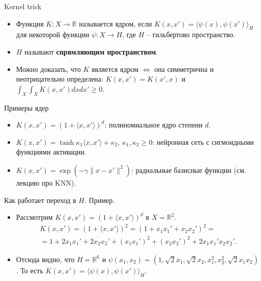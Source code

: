 \documentclass[9pt]{beamer}
\begin{document}
\begin{frame}{Kernel trick}
    \begin{itemize}
        \item Функция $K: X\rightarrow \mathbb{R}$ называется ядром, если $K(x, x') = \langle \psi(x), \psi(x')\rangle_H$ для некоторой функции $\psi: X\rightarrow H$, где $H$ -- гильбертово пространство.
        \item $H$ называют \textbf{спрямляющим пространством}.
        \item Можно доказать, что $K$ является ядром $\Leftrightarrow$ она симметрична и неотрицательно определена: $K(x, x') = K(x', x)$ и $\int_X\int_X K(x, x')dxdx'\geq 0$.
    \end{itemize}
\end{frame}

\begin{frame}{Примеры ядер}
\begin{itemize}
    \item $K(x, x') = (1 + \langle x, x'\rangle)^d$: полиномиальное ядро степени $d$.
    \item $K(x, x') = \tanh \kappa_1 \langle x, x'\rangle + \kappa_2$, $\kappa_1, \kappa_2 \geq 0$: нейронная сеть с сигмоидными функциями активации.
    \item $K(x, x') = \exp(-\gamma\|x-x'\|^2)$: радиальные базисные функции (см. лекцию про KNN).
\end{itemize}
\end{frame}

\begin{frame}{Как работает переход в $H$. Пример.}
    \begin{itemize}
        \item Рассмотрим $K(x, x')=(1 + \langle x, x'\rangle)^d$ в $X=\mathbb{R}^2$.
        \begin{equation*}
            \begin{split}
                K(x,x') = (1 + \langle x, x'\rangle)^2 = (1 + x_1x_1' + x_2x_2')^2 =\\
                = 1 + 2x_1x_1' + 2x_2x_2' + (x_1x_1')^2 + (x_2x_2')^2 + 2x_1x_1'x_2x_2'.
            \end{split}
        \end{equation*}
        \item Отсюда видно, что $H=\mathbb{R}^6$ и $\psi(x_1, x_2) = (1, \sqrt{2}x_1, \sqrt{2}x_2, x_1^2, x_2^2, \sqrt{2}x_1x_2)$. То есть $K(x, x') = \langle \psi(x), \psi(x')\rangle_H$.
    \end{itemize}
\end{frame}
\end{document}
